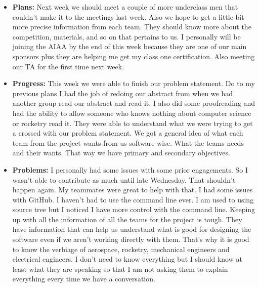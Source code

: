 \documentclass[10pt,draftclsnofoot,onecolumn]{IEEEtran}
\begin{document}
\begin{itemize}
	\item \textbf{Plans: }Next week we should meet a couple of more underclass men that couldn't make it to the meetings last week. Also we hope to get a little bit more precise information from each team. They should know more about the competition, materials, and so on that pertains to us. I personally will be joining the AIAA by the end of this week because they are one of our main sponsors plus they are helping me get my class one certification. Also meeting our TA for the first time next week.
	\item \textbf{Progress: }This week we were able to finish our problem statement. Do to my previous plans I had the job of redoing our abstract from when we had another group read our abstract and read it. I also did some proofreading and had the ability to allow someone who knows nothing about computer science or rocketry read it. They were able to understand what we were trying to get a crossed with our problem statement. We got a general idea of what each team from the project wants from us software wise. What the teams needs and their wants. That way we have primary and secondary objectives.
	\item \textbf{Problems: }I personally had some issues with some prior engagements. So I wasn't able to contribute as much until late Wednesday. That shouldn't happen again. My teammates were great to help with that. I had some issues with GitHub. I haven't had to use the command line ever. I am used to using source tree but I noticed I have more control with the command line. Keeping up with all the information of all the teams for the project is tough. They have information that can help us understand what is good for designing the software even if we aren't working directly with them. That's why it is good to know the verbiage of aerospace, rocketry, mechanical engineers and electrical engineers. I don't need to know everything but I should know at least what they are speaking so that I am not asking them to explain everything every time we have a conversation.
\end{itemize}
\end{document}
